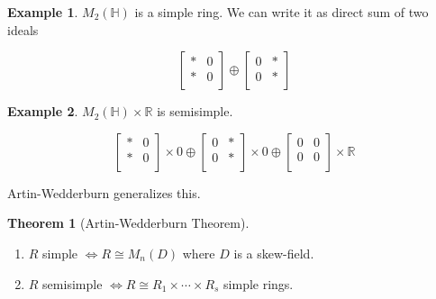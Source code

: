 \documentclass{article}
\theoremstyle{definition}
\newtheorem*{example}{Example}
\newtheorem{theorem}{Theorem}
\begin{document}
\begin{example}
    \(M_2(\mathbb{H})\) is a simple ring. We can write it as direct sum of two ideals

    \[
        \begin{bmatrix}
            \ast &  0 \\
            \ast &  0 \\
        \end{bmatrix} \oplus \begin{bmatrix}
            0 &  \ast \\
            0 &  \ast \\
        \end{bmatrix}
    \]
\end{example}


\begin{example}
    \(M_2(\mathbb{H}) \times \mathbb{R}\) is semisimple.

    \[
        \begin{bmatrix}
            \ast &  0 \\
            \ast &  0 \\
        \end{bmatrix} \times 0 \oplus \begin{bmatrix}
            0 &  \ast \\
            0 &  \ast \\
        \end{bmatrix} \times 0 \oplus \begin{bmatrix}
            0 &  0 \\
            0 &  0 \\
        \end{bmatrix} \times \mathbb{R}
    \]
\end{example}

Artin-Wedderburn generalizes this.

\begin{theorem}
    [Artin-Wedderburn Theorem]

    \begin{enumerate}[label=\roman*)]

        \item   \(R\) simple \(\iff  R\cong M_n(D)\) where \(D\) is a skew-field.

        \item \(R\) semisimple \(\iff R \cong R_1 \times \cdots \times R_s\) simple rings.
    \end{enumerate}
\end{theorem}
\end{document}

